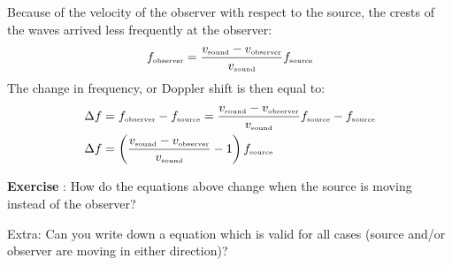 \documentclass[12pt,a4paper]{article}
\numberwithin{equation}{section}
\numberwithin{figure}{section}
\newcounter{Exercise}
\numberwithin{table}{section}
\begin{document}
Because of the velocity of the observer with respect to the source, the crests of the waves arrived less frequently at the observer:
\begin{equation}
f_{\mbox{\begin{tiny}observer\end{tiny}}} = \frac{v_{\mbox{\begin{tiny}sound\end{tiny}}} - v_{\mbox{\begin{tiny}observer\end{tiny}}}}{v_{\mbox{\begin{tiny}sound\end{tiny}}}} f_{\mbox{\begin{tiny}source\end{tiny}}} \label{eq:doppler_f_obs}
\end{equation}
The change in frequency, or Doppler shift is then equal to:
\begin{align}
\Delta f &= f_{\mbox{\begin{tiny}observer\end{tiny}}} - f_{\mbox{\begin{tiny}source\end{tiny}}}= \frac{v_{\mbox{\begin{tiny}sound\end{tiny}}} - v_{\mbox{\begin{tiny}observer\end{tiny}}}}{v_{\mbox{\begin{tiny}sound\end{tiny}}}} f_{\mbox{\begin{tiny}source\end{tiny}}} - f_{\mbox{\begin{tiny}source\end{tiny}}} \\
\Delta f &= \left( \frac{v_{\mbox{\begin{tiny}sound\end{tiny}}} - v_{\mbox{\begin{tiny}observer\end{tiny}}}}{v_{\mbox{\begin{tiny}sound\end{tiny}}}} -1 \right)  f_{\mbox{\begin{tiny}source\end{tiny}}}
 \label{eq:f_delta_away}
\end{align}

\begin{shaded}
\textbf{Exercise \theExercise {}} : How do the equations above change when the source is moving instead of the observer?

Extra: Can you write down a equation which is valid for all cases (source and/or observer are moving in either direction)? \end{shaded}
\end{document}
